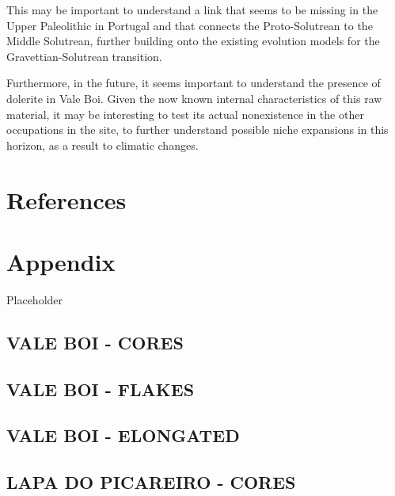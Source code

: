 \documentclass[12pt,twoside]{reedthesis}
\begin{document}
This may be important to understand a link that seems to be missing in the Upper Paleolithic in Portugal and that connects the Proto-Solutrean to the Middle Solutrean, further building onto the existing evolution models for the Gravettian-Solutrean transition.

Furthermore, in the future, it seems important to understand the presence of dolerite in Vale Boi. Given the now known internal characteristics of this raw material, it may be interesting to test its actual nonexistence in the other occupations in the site, to further understand possible niche expansions in this horizon, as a result to climatic changes.

\hypertarget{references}{%
\chapter*{References}\label{references}}


\noindent

\setlength{\parindent}{-0.20in}
\setlength{\leftskip}{0.20in}
\setlength{\parskip}{8pt}

\hypertarget{appendix}{%
\chapter{Appendix}\label{appendix}}

Placeholder

\hypertarget{vale-boi---cores}{%
\section{VALE BOI - CORES}\label{vale-boi---cores}}

\hypertarget{vale-boi---flakes}{%
\section{VALE BOI - FLAKES}\label{vale-boi---flakes}}

\hypertarget{vale-boi---elongated}{%
\section{VALE BOI - ELONGATED}\label{vale-boi---elongated}}

\hypertarget{lapa-do-picareiro---cores}{%
\section{LAPA DO PICAREIRO - CORES}\label{lapa-do-picareiro---cores}}
\end{document}

